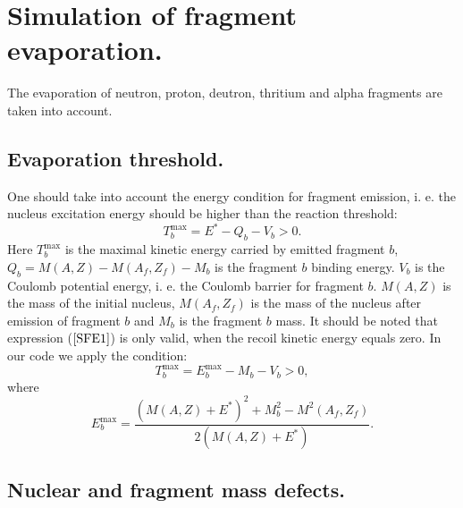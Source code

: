 \section{Simulation of fragment evaporation.}

\hspace{1.0em} The evaporation of
 neutron, proton, deutron, thritium and alpha fragments 
 are taken into account. 

\subsection{Evaporation threshold.} 

\hspace{1.0em}One should take into account the energy condition
for fragment emission, i. e. the nucleus 
excitation energy should be higher than
the reaction threshold:
\begin{equation}
\label{SFE1}T_b^{\max }=E^{*}-Q_b-V_b > 0. 
\end{equation}
Here $T_b^{\max }$ is the maximal kinetic energy carried by emitted
fragment $b$, $Q_b = M(A,Z)-M(A_f,Z_f)-M_b$ is the fragment $b$ binding
energy. $V_b$ is the Coulomb
potential energy, i. e. the Coulomb barrier for fragment $b$.
 $M(A,Z)$ is the mass of the initial nucleus, $M(A_f,Z_f)$ is
the mass of the nucleus after emission of fragment $b$ and $M_b$ is the
fragment $b$ mass. It should be noted that expression ($\ref{SFE1}$) is 
only valid, when the recoil kinetic energy equals zero. In our code we 
apply the condition:
\begin{equation}
\label{SFE2}T_b^{\max }=E_b^{\max}-M_b-V_b > 0, 
\end{equation}  
where
\begin{equation}
\label{SFE3}E_b^{\max }=\frac{(M(A,Z)+E^{*})^2+M^2_b-M^2(A_f,Z_f)}
{2(M(A,Z)+E^{*})}. 
\end{equation}

\subsection{Nuclear and fragment mass defects.} 

